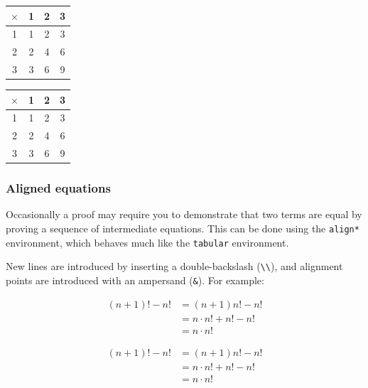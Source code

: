 \begin{texcodeleft}
\begin{tabular}{c|ccc}
$\times$ & 1 & 2 & 3 \\ \hline
1 & 1 & 2 & 3 \\
2 & 2 & 4 & 6 \\
3 & 3 & 6 & 9
\end{tabular}
\end{texcodeleft}
%
\begin{texcoderight}
\begin{center}
\begin{tabular}{c|ccc}
$\times$ & 1 & 2 & 3 \\  \hline
1 & 1 & 2 & 3 \\
2 & 2 & 4 & 6 \\
3 & 3 & 6 & 9
\end{tabular}
\end{center}
\end{texcoderight}

\subsubsection*{Aligned equations}
Occasionally a proof may require you to demonstrate that two terms are equal by proving a sequence of intermediate equations. This can be done using the \lstinline|align*| environment, which behaves much like the \lstinline|tabular| environment.

New lines are introduced by inserting a double-backslash (\lstinline|\\|), and alignment points are introduced with an ampersand (\lstinline|&|). For example:

\begin{texcodeleft}
\begin{align*}
(n+1)! - n!
  &= (n+1)n! - n! \\
  &= n \cdot n! + n! - n! \\
  &= n \cdot n!
\end{align*}
\end{texcodeleft}
%
\begin{texcoderight}
\vspace{-10pt}
\begin{minipage}{\textwidth}
\begin{align*}
(n+1)! - n! & = (n+1)n! - n! \\
            & = n \cdot n! + n! - n! \\
            & = n \cdot n!
\end{align*}
\vspace{-20pt}
\end{minipage}
\end{texcoderight}

